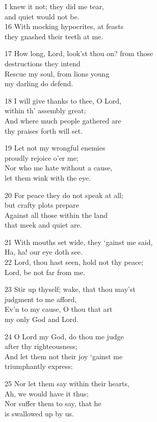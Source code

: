 \begin{multicols}{3}
I knew it not; they did me tear,\\
and quiet would not be.\\
16 With mocking hypocrites, at feasts\\
they gnashed their teeth at me.

17 How long, Lord, look’st thou on? from those\\
destructions they intend\\
Rescue my soul, from lions young\\
my darling do defend.

18 I will give thanks to thee, O Lord,\\
within th’ assembly great;\\
And where much people gathered are\\
thy praises forth will set.

19 Let not my wrongful enemies\\
proudly rejoice o’er me;\\
Nor who me hate without a cause,\\
let them wink with the eye.

20 For peace they do not speak at all;\\
but crafty plots prepare\\
Against all those within the land\\
that meek and quiet are.

21 With mouths set wide, they ‘gainst me said,\\
Ha, ha! our eye doth see.\\
22 Lord, thou hast seen, hold not thy peace;\\
Lord, be not far from me.

23 Stir up thyself; wake, that thou may’st\\
judgment to me afford,\\
Ev’n to my cause, O thou that art\\
my only God and Lord.

24 O Lord my God, do thou me judge\\
after thy righteousness;\\
And let them not their joy ‘gainst me\\
triumphantly express:

25 Nor let them say within their hearts,\\
Ah, we would have it thus;\\
Nor suffer them to say, that he\\
is swallowed up by us.


\end{multicols}
